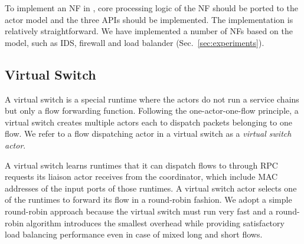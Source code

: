 



To implement an NF in \nfactor, core processing logic of the NF should be ported to the actor model and the three APIs should be implemented. The implementation is relatively straightforward. We have implemented a number of NFs based on the model, such as IDS, firewall and load balander (Sec.~\ref{sec:experiments}).


\subsection{Virtual Switch}
\label{sec:virtualswitch}

A virtual switch is a special runtime where the actors do not run a service chains but only a flow forwarding function. Following the one-actor-one-flow principle, a virtual switch creates multiple actors each to dispatch packets belonging to one flow. We refer to a flow dispatching actor in a virtual switch as a {\em virtual switch actor}.


A virtual switch learns runtimes that it can dispatch flows to through RPC requests its liaison actor receives from the coordinator, which include MAC addresses of the input ports of those runtimes. A virtual switch actor selects one of the runtimes to forward its flow in a round-robin fashion. We adopt a simple round-robin approach because the virtual switch must run very fast and a round-robin algorithm introduces the smallest overhead while providing satisfactory load balancing performance even in case of mixed long and short flows.

